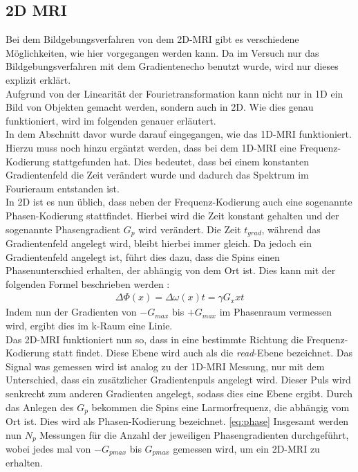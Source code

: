 \subsection{2D MRI}
Bei dem Bildgebungsverfahren von dem 2D-MRI gibt es verschiedene Möglichkeiten, wie hier vorgegangen werden kann. Da im Versuch nur das Bildgebungsverfahren mit dem Gradientenecho benutzt wurde, wird nur dieses explizit erklärt.\\
Aufgrund von der Linearität der Fourietransformation kann nicht nur in 1D ein Bild von Objekten gemacht werden, sondern auch in 2D. Wie dies genau funktioniert, wird im folgenden genauer erläutert.\\
In dem Abschnitt davor wurde darauf eingegangen, wie das 1D-MRI funktioniert. Hierzu muss noch hinzu ergäntzt werden, dass bei dem 1D-MRI eine Frequenz-Kodierung stattgefunden hat. Dies bedeutet, dass bei einem konstanten Gradientenfeld die Zeit verändert wurde und dadurch das Spektrum im Fourieraum entstanden ist. \\
In 2D ist es nun üblich, dass neben der Frequenz-Kodierung auch eine sogenannte Phasen-Kodierung stattfindet. Hierbei wird die Zeit konstant gehalten und der sogenannte Phasengradient $G_p$ wird verändert. Die Zeit $t_{grad}$, während das Gradientenfeld angelegt wird, bleibt hierbei immer gleich. Da jedoch ein Gradientenfeld angelegt ist, führt dies dazu, dass die Spins einen Phasenunterschied erhalten, der abhängig von dem Ort ist. Dies kann mit der folgenden Formel beschrieben werden \cite{Schmidt}:
\begin{align}
    \Delta\Phi(x)= \Delta\omega(x)t=\gamma G_xxt
\end{align}\label{eq:phase}
Indem nun der Gradienten von $-G_{max}$ bis $+G_{max}$ im Phasenraum vermessen wird, ergibt dies im k-Raum eine Linie.\\
Das 2D-MRI funktioniert nun so, dass in eine bestimmte Richtung die Frequenz-Kodierung statt findet. Diese Ebene wird auch als die \textit{read}-Ebene bezeichnet. Das Signal was gemessen wird ist analog zu der 1D-MRI Messung, nur mit dem Unterschied, dass ein zusätzlicher Gradientenpuls angelegt wird. Dieser Puls wird senkrecht zum anderen Gradienten angelegt, sodass dies eine Ebene ergibt. Durch das Anlegen des $G_p$ bekommen die Spins eine Larmorfrequenz, die abhängig vom Ort ist. Dies wird als Phasen-Kodierung bezeichnet. \ref{eq:phase}
Insgesamt werden nun $N_p$ Messungen für die Anzahl der jeweiligen Phasengradienten durchgeführt, wobei jedes mal von $-G_{pmax}$ bis $G_{pmax}$ gemessen wird, um ein 2D-MRI zu erhalten.
